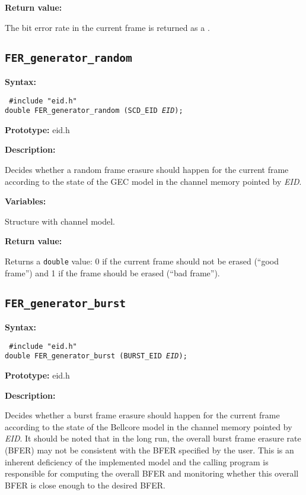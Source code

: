 {\bf Return value: }

The bit error rate in the current frame is returned as a \double.


\subsection{{\tt FER\_generator\_random}}

{\bf Syntax: }

{\tt
\#include "eid.h"\\
double FER\_generator\_random (SCD\_EID {\em *EID});
}

{\bf Prototype: }    eid.h

{\bf Description: }

Decides whether a random frame erasure should happen for the current frame
according to the state of the GEC model in the channel memory
pointed by {\em EID}.

{\bf Variables: }
\begin{Descr}{\DescrLen}
 \item[\pbox{20mm}{\em EID}] Structure with channel model.
\end{Descr}

{\bf Return value: }

Returns a {\tt double} value: 0 if the current frame should not be
erased (``good frame'') and 1 if the frame should be erased (``bad
frame'').


\subsection{{\tt FER\_generator\_burst}}

{\bf Syntax: }

{\tt
\#include "eid.h"\\
double FER\_generator\_burst (BURST\_EID {\em *EID}); }

{\bf Prototype: }    eid.h

{\bf Description: }

Decides whether a burst frame erasure should happen for the current
frame according to the state of the Bellcore model in the channel
memory pointed by {\em EID}. It should be noted that in the long run,
the overall burst frame erasure rate (BFER) may not be consistent with
the BFER specified by the user. This is an inherent deficiency of the
implemented model and the calling program is responsible for computing
the overall BFER and monitoring whether this overall BFER is close
enough to the desired BFER.

